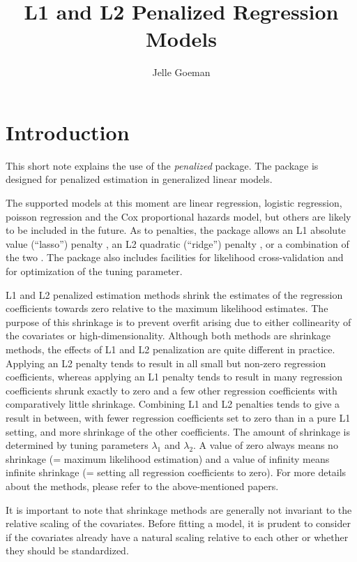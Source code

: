 \documentclass[a4paper]{article}
\title{L1 and L2 Penalized Regression Models}
\author{Jelle Goeman}
\newcommand{\Rpackage}[1]{{\textit{#1}}}
\begin{document}
\maketitle \tableofcontents \newpage

\section{Introduction}

This short note explains the use of the \Rpackage{penalized} package. The package is designed for penalized estimation in generalized linear models.

The supported models at this moment are linear regression, logistic regression, poisson regression and the Cox proportional hazards model, but others are likely to be included in the future. As to penalties, the package allows an L1 absolute value (``lasso'') penalty \citep{Tibshirani1996, Tibshirani1997}, an L2 quadratic (``ridge'') penalty \citep{Hoerl1970, Cessie1992, Verweij1994}, or a combination of the two \citep[the ``naive elastic net'' of][]{Zou2005}. The package also includes facilities for likelihood cross-validation and for optimization of the tuning parameter.

L1 and L2 penalized estimation methods shrink the estimates of the regression coefficients towards zero relative to the maximum likelihood estimates. The purpose of this shrinkage is to prevent overfit arising due to either collinearity of the covariates or high-dimensionality. Although both methods are shrinkage methods, the effects of L1 and L2 penalization are quite different in practice. Applying an L2 penalty tends to result in all small but non-zero regression coefficients, whereas applying an L1 penalty tends to result in many regression coefficients shrunk exactly to zero and a few other regression coefficients with comparatively little shrinkage. Combining L1 and L2 penalties tends to give a result in between, with fewer regression coefficients set to zero than in a pure L1 setting, and more shrinkage of the other coefficients. The amount of shrinkage is determined by tuning parameters $\lambda_1$ and $\lambda_2$. A value of zero always means no shrinkage (= maximum likelihood estimation) and a value of infinity means infinite shrinkage (= setting all regression coefficients to zero). For more details about the methods, please refer to the above-mentioned papers.

It is important to note that shrinkage methods are generally not invariant to the relative scaling of the covariates. Before fitting a model, it is prudent to consider if the covariates already have a natural scaling relative to each other or whether they should be standardized.
\end{document}
